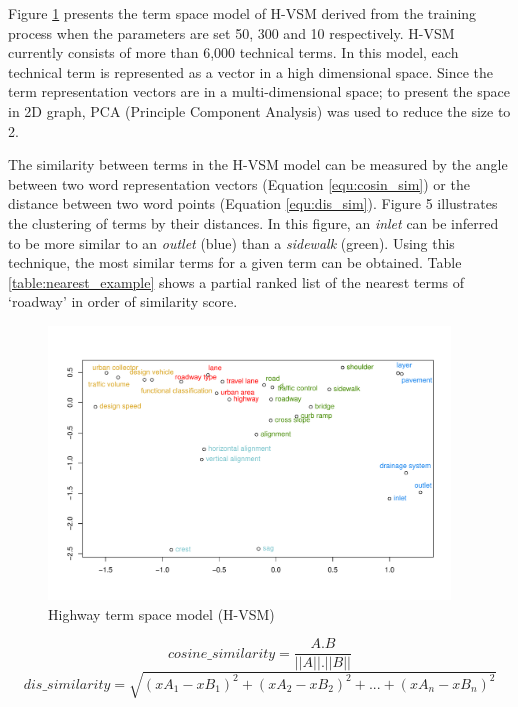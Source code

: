 \documentclass[Journal, BackFigs, DoubleSpace]{ascelike}%
\begin{document}
%
\par
Figure \ref{fig:hvsm} presents the term space model of H-VSM derived from the training process when the parameters are set 50, 300 and 10 respectively. H-VSM currently consists of more than 6,000 technical terms. In this model, each technical term is represented as a vector in a high dimensional space. Since the term representation vectors are in a multi-dimensional space; to present the space in 2D graph, PCA (Principle Component Analysis) was used to reduce the size to 2.
\par
The similarity between terms in the H-VSM model can be measured by the angle between two word representation vectors (Equation \ref{equ:cosin_sim}) or the distance between two word points (Equation \ref{equ:dis_sim}). Figure 5 illustrates the clustering of terms by their distances. In this figure, an \textit{inlet} can be inferred to be more similar to an \textit{outlet} (blue) than a \textit{sidewalk} (green). Using this technique, the most similar terms for a given term can be obtained. Table \ref{table:nearest_example} shows a partial ranked list of the nearest terms of `roadway' in order of similarity score.
%
\begin{figure}[t]
	\centering
	\includegraphics[width=0.95\textwidth]{Figure5_hvsm_space}
	\caption{Highway term space model (H-VSM)}
	\label{fig:hvsm}
\end{figure}
%
\begin{equation}
\label{equ:cosin_sim}
cosine\_similarity = \frac{A.B}{||A||.||B||}
\end{equation}
%
\begin{equation}
\label{equ:dis_sim}
dis\_similarity =\sqrt{(xA_1-xB_1)^2+(xA_2-xB_2)^2+...+(xA_n-xB_n)^2}
\end{equation}
\end{document}
